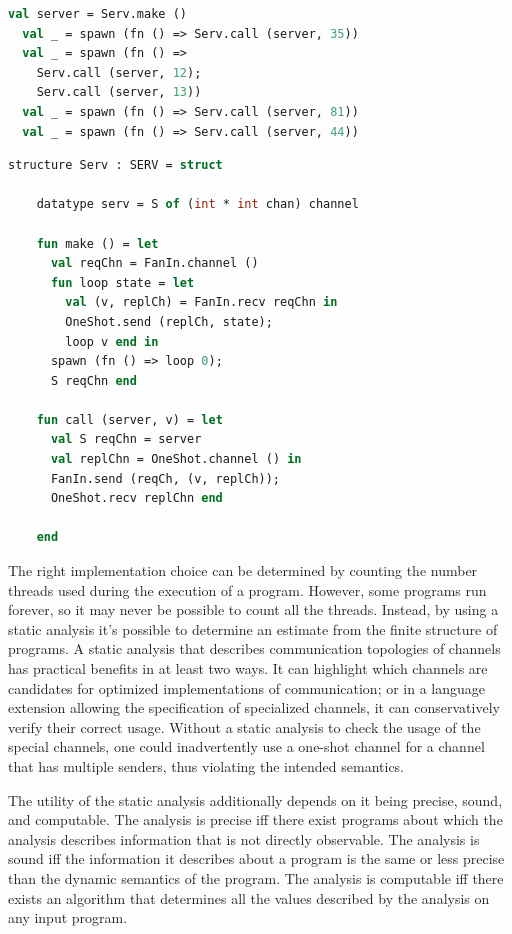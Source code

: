 \documentclass{article}
\begin{document}
\begin{lstlisting}[language=ML, escapechar=\%]
  val server = Serv.make ()
  val _ = spawn (fn () => Serv.call (server, 35))
  val _ = spawn (fn () => 
    Serv.call (server, 12); 
    Serv.call (server, 13))
  val _ = spawn (fn () => Serv.call (server, 81))
  val _ = spawn (fn () => Serv.call (server, 44))
  \end{lstlisting}

\begin{lstlisting}[language=ML, escapechar=\%]
  structure Serv : SERV = struct 

    datatype serv = S of (int * int chan) channel 

    fun make () = let 
      val reqChn = FanIn.channel ()
      fun loop state = let
        val (v, replCh) = FanIn.recv reqChn in 
        OneShot.send (replCh, state);
        loop v end in
      spawn (fn () => loop 0);
      S reqChn end 

    fun call (server, v) = let 
      val S reqChn = server
      val replChn = OneShot.channel () in 
      FanIn.send (reqCh, (v, replCh));
      OneShot.recv replChn end

    end
  \end{lstlisting}

The right implementation choice can be determined by counting the number threads used during
the execution of a program. However, some programs run forever, so it may never be possible to
count all the threads. Instead, by using a static analysis it's possible to determine an
estimate from the finite structure of programs. A static analysis that describes communication
topologies of channels has practical benefits in at least two ways.  It can highlight which
channels are candidates for optimized implementations of communication; or in a language
extension allowing the specification of specialized channels, it can conservatively verify
their correct usage. Without a static analysis to check the usage of the special channels, one
could inadvertently use a one-shot channel for a channel that has multiple senders, thus
violating the intended semantics. 

The utility of the static analysis additionally depends on it being precise, sound, and
computable. The analysis is precise iff there exist programs about which the analysis
describes information that is not directly observable. The analysis is sound iff the
information it describes about a program is the same or less precise than the dynamic
semantics of the program. The analysis is computable iff there exists an algorithm that
determines all the values described by the analysis on any input program.
\end{document}
